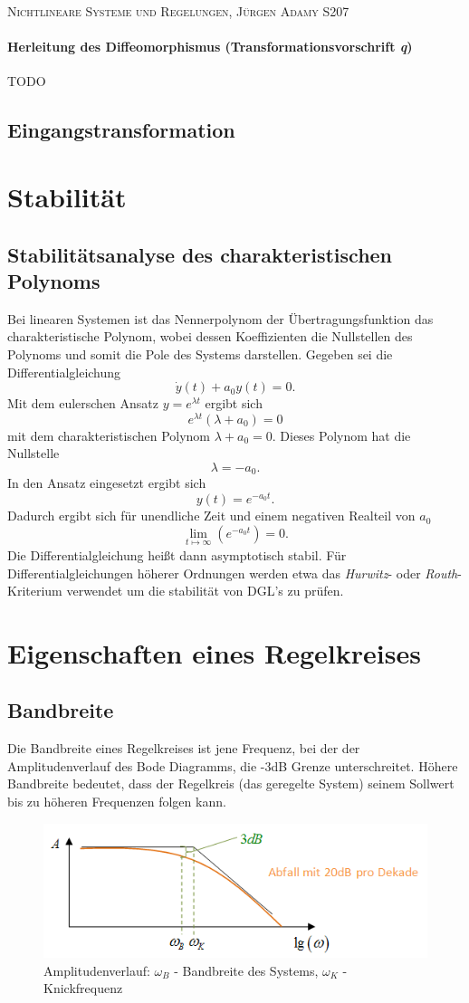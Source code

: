 			 \textsc{Nichtlineare Systeme und Regelungen, Jürgen Adamy S207}
			 \paragraph{Herleitung des Diffeomorphismus (Transformationsvorschrift \textit{ q})}
			 TODO				
			
	\subsection{Eingangstransformation}
		
\section{Stabilität}
	\subsection{Stabilitätsanalyse des charakteristischen Polynoms}	
		Bei linearen Systemen ist das Nennerpolynom der Übertragungsfunktion das charakteristische Polynom, wobei dessen Koeffizienten die Nullstellen des Polynoms und somit die Pole des Systems darstellen. Gegeben sei die Differentialgleichung
		\[\dot{y}(t) + a_{0}y(t) = 0. \]
		Mit dem eulerschen Ansatz $ y=e^{\lambda t} $ ergibt sich
		\[e^{\lambda t}(\lambda + a_{0}) = 0\]
		mit dem charakteristischen Polynom $ \lambda + a_{0} = 0 $. Dieses Polynom hat die Nullstelle 
		\[\lambda=-a_{0}.\]
		In den Ansatz eingesetzt ergibt sich
		\[ y(t)=e^{-a_{0} t}. \]
		Dadurch ergibt sich für unendliche Zeit und einem negativen Realteil von $ a_{0} $
		\[\lim\limits_{t\mapsto \infty}(e^{-a_{0} t}) = 0.\]
		Die Differentialgleichung heißt dann asymptotisch stabil. Für Differentialgleichungen höherer Ordnungen werden etwa das \textit{Hurwitz}- oder \textit{Routh}-Kriterium verwendet um die stabilität von DGL's zu prüfen.
	
\section{Eigenschaften eines Regelkreises}
	\subsection{Bandbreite}
		Die Bandbreite eines Regelkreises ist jene Frequenz, bei der der Amplitudenverlauf des Bode Diagramms, die -3dB Grenze unterschreitet. Höhere Bandbreite bedeutet, dass der Regelkreis (das geregelte System) seinem Sollwert bis zu höheren Frequenzen folgen kann.
		\begin{figure}[h]
			\centering
			\includegraphics[width=0.7\linewidth]{./pics/re/band}
			\caption{Amplitudenverlauf: $ \omega_{B} $ - Bandbreite des Systems, $ \omega_{K} $ - Knickfrequenz}
			\label{}
		\end{figure}
		\leavevmode \\
	
